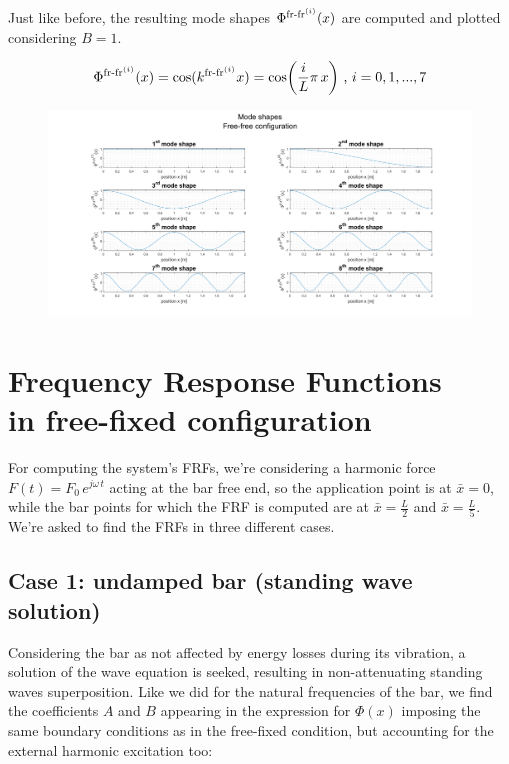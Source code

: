 \documentclass[a4paper,12pt,oneside]{article}
\begin{document}
Just like before, the resulting mode shapes $ \Phi^{\textup{fr-fr}^{(i)}}(x) $ are computed and plotted considering $ B = 1 $.

\[
	\Phi^{\textup{fr-fr}^{(i)}}(x) = \cos(k^{\textup{fr-fr}^{(i)}} x) =
		\cos\biggl(\frac{i}{L} \pi \, x\biggr) ~ \text{,} ~ i = 0,1,...,7
\]

\begin{figure}[h]
	\hspace{-70pt}
	\includegraphics[scale=0.4]{mode_shapes_free_free}
\end{figure}


\section{Frequency Response Functions \\ in free-fixed configuration}
\label{sec:frfs}

For computing the system's FRFs, we're considering a harmonic force $ F(t) = F_0 \, e^{j \omega \, t} $ acting at the bar free end, so the application point is at $ \bar{x} = 0 $, while the bar points for which the FRF is computed are at $ \bar{x} = \frac{L}{2} $ and $ \bar{x} = \frac{L}{5} $. We're asked to find the FRFs in three different cases.

\subsection*{Case 1: undamped bar (standing wave solution)}

Considering the bar as not affected by energy losses during its vibration, a solution of the wave equation is seeked, resulting in non-attenuating standing waves superposition. Like we did for the natural frequencies of the bar, we find the coefficients $ A $ and $ B $ appearing in the expression for $ \Phi(x) $ imposing the same boundary conditions as in the free-fixed condition, but accounting for the external harmonic excitation too:
\end{document}
